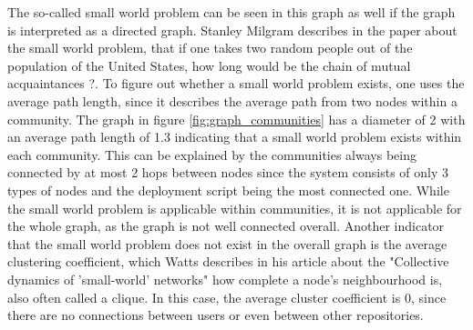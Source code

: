 The so-called small world problem can be seen in this graph as well if the graph is interpreted as a directed graph. Stanley Milgram describes in the paper about the small world problem, that if one takes two random people out of the population of the United States, how long would be the chain of mutual acquaintances \cite{SmallWorld} ?. To figure out whether a small world problem exists, one uses the average path length, since it describes the average path from two nodes within a community. The graph in figure \ref{fig:graph_communities} has a diameter of 2 with an average path length of 1.3 indicating that a small world problem exists within each community. This can be explained by the communities always being connected by at most 2 hops between nodes since the system consists of only 3 types of nodes and the deployment script being the most connected one. While the small world problem is applicable within communities, it is not applicable for the whole graph, as the graph is not well connected overall. Another indicator that the small world problem does not exist in the overall graph is the average clustering coefficient, which Watts describes in his article about the "Collective dynamics of 'small-world' networks" \cite{Watts1998Collective} how complete a node's neighbourhood is, also often called a clique. In this case, the average cluster coefficient is 0, since there are no connections between users or even between other repositories.

